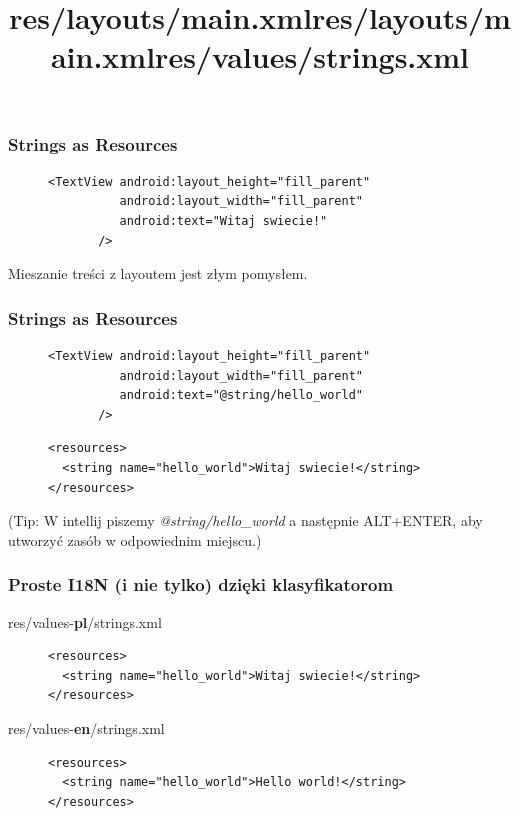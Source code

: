 \documentclass{beamer}
\begin{document}
\begin{frame}[fragile]\frametitle{Strings as Resources}
\begin{figure}
\title{res/layouts/main.xml}
\begin{lstlisting}
<TextView android:layout_height="fill_parent"
          android:layout_width="fill_parent"
          android:text="Witaj swiecie!"
       />
\end{lstlisting}
\end{figure}

Mieszanie treści z layoutem jest złym pomysłem.
\end{frame}

\begin{frame}[fragile]\frametitle{Strings as Resources}
\begin{figure}
\title{res/layouts/main.xml}
\begin{lstlisting}
<TextView android:layout_height="fill_parent"
          android:layout_width="fill_parent"
          android:text="@string/hello_world"
       />
\end{lstlisting}
\end{figure}

\begin{figure}
 \title{res/values/strings.xml}
\begin{lstlisting}
<resources>
  <string name="hello_world">Witaj swiecie!</string>
</resources>
\end{lstlisting}
\end{figure}

(Tip: W intellij piszemy \textit{@string/hello\_world} a następnie ALT+ENTER, aby utworzyć zasób w odpowiednim miejscu.)
\end{frame}

\begin{frame}[fragile]\frametitle{Proste I18N (i nie tylko) dzięki klasyfikatorom}

\centering
\ttfamily 
res/values-\textbf{pl}/strings.xml

\begin{figure}
\begin{lstlisting}
<resources>
  <string name="hello_world">Witaj swiecie!</string>
</resources>
\end{lstlisting}
\end{figure}

\centering
\ttfamily 
res/values-\textbf{en}/strings.xml
\begin{figure}
\begin{lstlisting}
<resources>
  <string name="hello_world">Hello world!</string>
</resources>
\end{lstlisting}
\end{figure}


\end{frame}
\end{document}
